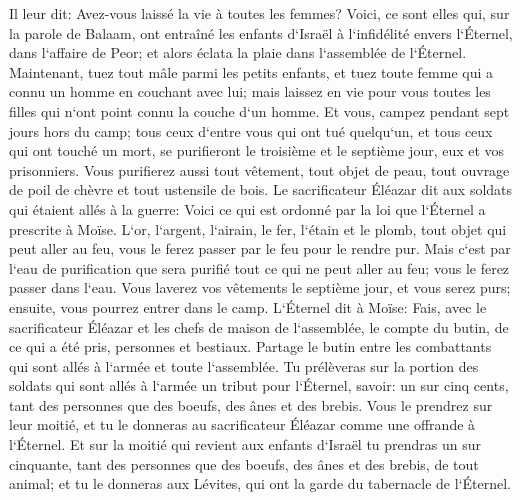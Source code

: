 \verse Il leur dit: Avez-vous laissé la vie à toutes les femmes? 
\verse Voici, ce sont elles qui, sur la parole de Balaam, ont entraîné les enfants d`Israël à l`infidélité envers l`Éternel, dans l`affaire de Peor; et alors éclata la plaie dans l`assemblée de l`Éternel. 
\verse Maintenant, tuez tout mâle parmi les petits enfants, et tuez toute femme qui a connu un homme en couchant avec lui; 
\verse mais laissez en vie pour vous toutes les filles qui n`ont point connu la couche d`un homme. 
\verse Et vous, campez pendant sept jours hors du camp; tous ceux d`entre vous qui ont tué quelqu`un, et tous ceux qui ont touché un mort, se purifieront le troisième et le septième jour, eux et vos prisonniers. 
\verse Vous purifierez aussi tout vêtement, tout objet de peau, tout ouvrage de poil de chèvre et tout ustensile de bois. 
\verse Le sacrificateur Éléazar dit aux soldats qui étaient allés à la guerre: Voici ce qui est ordonné par la loi que l`Éternel a prescrite à Moïse. 
\verse L`or, l`argent, l`airain, le fer, l`étain et le plomb, 
\verse tout objet qui peut aller au feu, vous le ferez passer par le feu pour le rendre pur. Mais c`est par l`eau de purification que sera purifié tout ce qui ne peut aller au feu; vous le ferez passer dans l`eau. 
\verse Vous laverez vos vêtements le septième jour, et vous serez purs; ensuite, vous pourrez entrer dans le camp. 
\verse L`Éternel dit à Moïse: 
\verse Fais, avec le sacrificateur Éléazar et les chefs de maison de l`assemblée, le compte du butin, de ce qui a été pris, personnes et bestiaux. 
\verse Partage le butin entre les combattants qui sont allés à l`armée et toute l`assemblée. 
\verse Tu prélèveras sur la portion des soldats qui sont allés à l`armée un tribut pour l`Éternel, savoir: un sur cinq cents, tant des personnes que des boeufs, des ânes et des brebis. 
\verse Vous le prendrez sur leur moitié, et tu le donneras au sacrificateur Éléazar comme une offrande à l`Éternel. 
\verse Et sur la moitié qui revient aux enfants d`Israël tu prendras un sur cinquante, tant des personnes que des boeufs, des ânes et des brebis, de tout animal; et tu le donneras aux Lévites, qui ont la garde du tabernacle de l`Éternel. 
